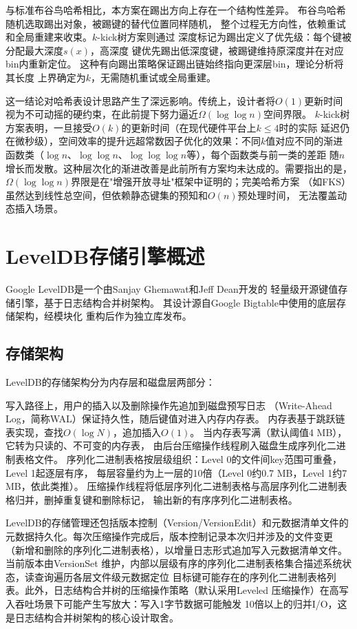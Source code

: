 \documentclass[
    type = bachelor,
    fontset = win,
    decl-page = true,
  ]{njuthesis}
\begin{document}
与标准布谷鸟哈希相比，本方案在踢出方向上存在一个结构性差异。
布谷鸟哈希随机选取踢出对象，被踢键的替代位置同样随机，
整个过程无方向性，依赖重试和全局重建来收束。$k$-kick树方案则通过
深度标记为踢出定义了优先级：每个键被分配最大深度$s(x)$，高深度
键优先踢出低深度键，被踢键维持原深度并在对应bin内重新定位。
这种有向踢出策略保证踢出链始终指向更深层bin，理论分析将其长度
上界确定为$k$，无需随机重试或全局重建。

\noindent 这一结论对哈希表设计思路产生了深远影响。传统上，设计者将$O(1)$更新时间
视为不可动摇的硬约束，在此前提下努力逼近$\Omega(\log\log n)$空间界限\cite{3,10}。
$k$-kick树方案表明，一旦接受$O(k)$的更新时间（在现代硬件平台上$k\le 4$时的实际
延迟仍在微秒级），空间效率的提升远超常数因子优化的效果：不同$k$值对应不同的渐进
函数类（$\log n$、$\log\log n$、$\log\log\log n$等），每个函数类与前一类的差距
随$n$增长而发散。这种层次化的渐进改善是此前所有方案均未达成的。需要指出的是，
$\Omega(\log\log n)$界限是在"增强开放寻址"框架中证明的\cite{1}；完美哈希方案
（如FKS\cite{10}）虽然达到线性总空间，但依赖静态键集的预知和$O(n)$预处理时间，
无法覆盖动态插入场景。

\section{LevelDB存储引擎概述}

Google LevelDB\cite{2}是一个由Sanjay Ghemawat和Jeff Dean开发的
轻量级开源键值存储引擎，基于日志结构合并树架构\cite{23}。
其设计源自Google Bigtable\cite{14}中使用的底层存储架构，经模块化
重构后作为独立库发布。

\subsection{存储架构}

LevelDB的存储架构分为内存层和磁盘层两部分：

写入路径上，用户的插入以及删除操作先追加到磁盘预写日志
（Write-Ahead Log，简称WAL）保证持久性，随后键值对进入内存内存表。
内存表基于跳跃链表\cite{24}实现，查找$O(\log N)$，追加插入$O(1)$。
当内存表写满（默认阈值4 MB），它转为只读的、不可变的内存表，
由后台压缩操作线程刷入磁盘生成序列化二进制表格文件。
序列化二进制表格按层级组织：Level 0的文件间key范围可重叠，Level 1起逐层有序，
每层容量约为上一层的10倍（Level 0约0.7 MB，Level 1约7 MB，依此类推）。
压缩操作线程将低层序列化二进制表格与高层序列化二进制表格归并，删掉重复键和删除标记，
输出新的有序序列化二进制表格。

LevelDB的存储管理还包括版本控制（Version/VersionEdit）和元数据清单文件的
元数据持久化。每次压缩操作完成后，版本控制记录本次归并涉及的文件变更
（新增和删除的序列化二进制表格），以增量日志形式追加写入元数据清单文件。当前版本由VersionSet
维护，内部以层级有序的序列化二进制表格集合描述系统状态，读查询遍历各层文件级元数据定位
目标键可能存在的序列化二进制表格列表。此外，日志结构合并树的压缩操作策略（默认采用Leveled
压缩操作）在高写入吞吐场景下可能产生写放大：写入1字节数据可能触发
10倍以上的归并I/O，这是日志结构合并树架构的核心设计取舍。
\end{document}
